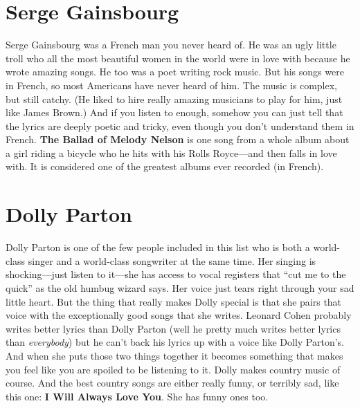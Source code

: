 \documentclass[letterpaper,single]{article}
\begin{document}
\section{Serge Gainsbourg}
Serge Gainsbourg was a French man you never heard of. 
He was an ugly little troll who all the most beautiful women in the world were in love with because he wrote amazing songs. 
He too was a poet writing rock music.
But his songs were in French, so most Americans have never heard of him. 
The music is complex, but still catchy. (He liked to hire really amazing musicians to play for him, just like James Brown.)
And if you listen to enough, somehow you can just tell that the lyrics are deeply poetic and tricky, even though you don't understand them in French.
\textbf{The Ballad of Melody Nelson} is one song from a whole album about a girl riding a bicycle who he hits with his Rolls Royce---and then falls in love with. 
It is considered one of the greatest albums ever recorded (in French).

\section{Dolly Parton}
Dolly Parton is one of the few people included in this list who is both a world-class singer and a world-class songwriter at the same time.
Her singing is shocking---just listen to it---she has access to vocal registers that ``cut me to the quick'' as the old humbug wizard says. 
Her voice just tears right through your sad little heart.
But the thing that really makes Dolly special is that she pairs that voice with the exceptionally good songs that she writes.
Leonard Cohen probably writes better lyrics than Dolly Parton (well he pretty much writes better lyrics than \emph{everybody}) but he can't back his lyrics up with a voice like Dolly Parton's.
And when she puts those two things together it becomes something that makes you feel like you are spoiled to be listening to it.
Dolly makes country music of course. And the best country songs are either really funny, or terribly sad, like this one: \textbf{I Will Always Love You}.
She has funny ones too.
\end{document}
